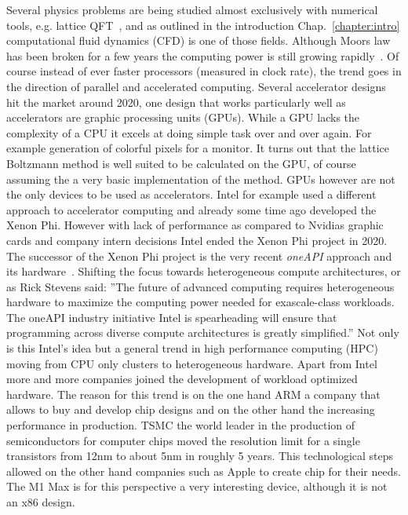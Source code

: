 Several physics problems are being studied almost exclusively with numerical tools, e.g. lattice QFT~\cite{montvay_münster_1994}, and as outlined in the introduction Chap.~\ref{chapter:intro} computational fluid dynamics (CFD) is one of those fields.
Although Moors law has been broken for a few years the computing power is still growing rapidly~\cite{591665}.
Of course instead of ever faster processors (measured in clock rate), the trend goes in the direction of parallel and accelerated computing. 
Several accelerator designs hit the market around 2020, one design that works particularly well as accelerators are graphic processing units (GPUs).
While a GPU lacks the complexity of a CPU it excels at doing simple task over and over again.
For example generation of colorful pixels for a monitor.
It turns out that the lattice Boltzmann method is well suited to be calculated on the GPU, of course assuming the a very basic implementation of the method.
GPUs however are not the only devices to be used as accelerators.
Intel for example used a different approach to accelerator computing and already some time ago developed the Xenon Phi.
However with lack of performance as compared to Nvidias graphic cards and company intern decisions Intel ended the Xenon Phi project in 2020.
The successor of the Xenon Phi project is the very recent \textit{oneAPI} approach and its hardware~\cite{9150323}.
Shifting the focus towards heterogeneous compute architectures, or as Rick Stevens said: ''The future of advanced computing requires heterogeneous hardware to maximize the computing power needed for exascale-class workloads. The oneAPI industry initiative Intel is spearheading will ensure that programming across diverse compute architectures is greatly simplified.''
Not only is this Intel's idea but a general trend in high performance computing (HPC) moving from CPU only clusters to heterogeneous hardware.
Apart from Intel more and more companies joined the development of workload optimized hardware.
The reason for this trend is on the one hand ARM a company that allows to buy and develop chip designs and on the other hand the increasing performance in production.
TSMC the world leader in the production of semiconductors for computer chips moved the resolution limit for a single transistors from 12nm to about 5nm in roughly 5 years.
This technological steps allowed on the other hand companies such as Apple to create chip for their needs. 
The M1 Max is for this perspective a very interesting device, although it is not an x86 design. 

